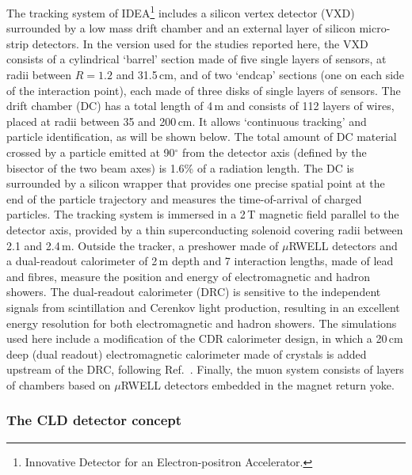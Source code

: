The tracking system of IDEA\footnote{Innovative Detector for an Electron-positron Accelerator.}
includes a silicon vertex detector (VXD) surrounded by a low mass drift chamber and an external layer of silicon micro-strip detectors. 
In the version used for the studies reported here, the VXD consists of 
a cylindrical `barrel' section made of five single layers of sensors, at radii between $R = 1.2$ and 31.5\,cm, 
and of two `endcap' sections (one on each side of the interaction point), each made of three disks of single layers of sensors. 
The drift chamber (DC) has a total length of 4\,m and consists of 112 layers of wires, placed at radii between 35 and 200\,cm. 
It allows `continuous tracking' and particle identification, as will be shown below. 
The total amount of DC material crossed by a particle emitted at 90$^{\circ}$ from the detector axis 
(defined by the bisector of the two beam axes) is 1.6\% of a radiation length. 
The DC is surrounded by a silicon wrapper that provides one precise spatial point at the end of the particle trajectory 
and measures the time-of-arrival of charged particles. 
The tracking system is immersed in a 2\,T magnetic field parallel to the detector axis, 
provided by a thin superconducting solenoid covering radii between 2.1 and 2.4\,m. 
Outside the tracker, a preshower made of $\mu$RWELL detectors and a dual-readout calorimeter of 2\,m depth and 7 interaction lengths, 
made of lead and fibres, measure the position and energy of electromagnetic and hadron showers. 
The dual-readout calorimeter (DRC) is sensitive to the independent signals from scintillation and Cerenkov light production, 
resulting in an excellent energy resolution for both electromagnetic and hadron showers.  
The simulations used here include a modification of the CDR calorimeter design, 
in which a 20\,cm deep (dual readout) electromagnetic calorimeter made of crystals is added upstream of the DRC, following Ref.~\cite{Lucchini:2020bac}. 
Finally, the muon system consists of layers of chambers based on $\mu$RWELL detectors embedded in the magnet return yoke. 

\subsubsection{The CLD detector concept}

